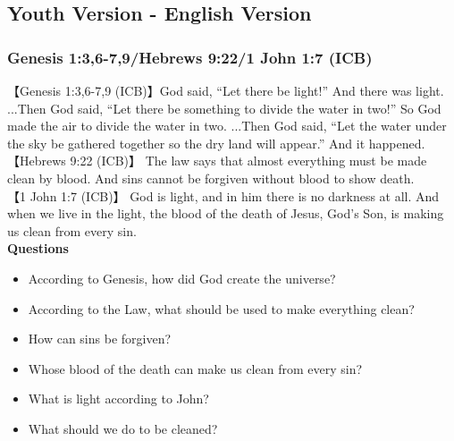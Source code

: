 \newpage
\Large
\subsection{\LARGE{Youth Version - English Version}}
\large
\vspace{.25cm}
\subsubsection{\large{Genesis 1:3,6-7,9/Hebrews 9:22/1 John 1:7 (ICB)}}
【Genesis 1:3,6-7,9 (ICB)】God said, “Let there be light!” And there was light. ...Then God said, “Let there be something to divide the water in two!” So God made the air to divide the water in two. ...Then God said, “Let the water under the sky be gathered together so the dry land will appear.” And it happened.\\
【Hebrews 9:22 (ICB)】 The law says that almost everything must be made clean by blood. And sins cannot be forgiven without blood to show death.\\
【1 John 1:7 (ICB)】 God is light, and in him there is no darkness at all. And when we live in the light, the blood of the death of Jesus, God’s Son, is making us clean from every sin.\\
\vspace{.25cm}
\textbf{Questions}\vspace{-.5cm}
\begin{itemize}[noitemsep]
\item According to Genesis, how did God create the universe?
\item According to the Law, what should be used to make everything clean?
\item How can sins be forgiven?
\item Whose blood of the death can make us clean from every sin?
\item What is light according to John?
\item What should we do to be cleaned?
\end{itemize}

\vspace{.25cm}
